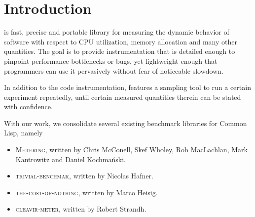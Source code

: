 \chapter{Introduction}

\sysname{} is fast, precise and portable library for measuring the dynamic
behavior of software with respect to CPU utilization, memory allocation and
many other quantities.  The goal is to provide instrumentation that is
detailed enough to pinpoint performance bottlenecks or bugs, yet
lightweight enough that programmers can use it pervasively without fear of
noticeable slowdown.

In addition to the code instrumentation, \sysname{} features a sampling
tool to run a certain experiment repeatedly, until certain measured
quantities therein can be stated with confidence.

With our work, we consolidate several existing benchmark libraries for
Common Lisp, namely

\begin{itemize}
\item \textsc{Metering}, written by Chris McConell, Skef Wholey, Rob
  MacLachlan, Mark Kantrowitz and Daniel Kochmański.

\item \textsc{trivial-benchmak}, written by Nicolas Hafner.

\item \textsc{the-cost-of-nothing}, written by Marco Heisig.

\item \textsc{cleavir-meter}, written by Robert Strandh.
\end{itemize}
